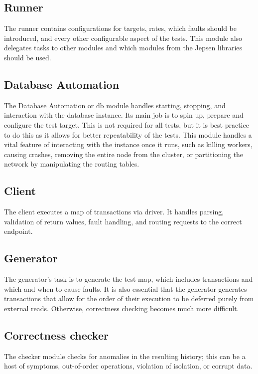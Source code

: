 \documentclass[a4paper,10pt,titlepage]{report}
\begin{document}
\subsection{Runner}

The runner contains configurations for targets, rates, which faults should be introduced, and every other configurable aspect of the tests. This module also delegates tasks to other modules and which modules from the Jepsen libraries should be used. 

\subsection{Database Automation}
 The Database Automation or db module handles starting, stopping, and interaction with the database instance. Its main job is to spin up, prepare and configure the test target. This is not required for all tests, but it is best practice to do this as it allows for better repeatability of the tests. This module handles a vital feature of interacting with the instance once it runs, such as killing workers, causing crashes, removing the entire node from the cluster, or partitioning the network by manipulating the routing tables.

\subsection{Client}
The client executes a map of transactions via driver. It handles parsing, validation of return values, fault handling, and routing requests to the correct endpoint.

\subsection{Generator}
The generator's task is to generate the test map, which includes transactions and which and when to cause faults. It is also essential that the generator generates transactions that allow for the order of their execution to be deferred purely from external reads. Otherwise, correctness checking becomes much more difficult. 

\subsection{Correctness checker}
The checker module checks for anomalies in the resulting history; this can be a host of symptoms, out-of-order operations, violation of isolation, or corrupt data. 
\end{document}
